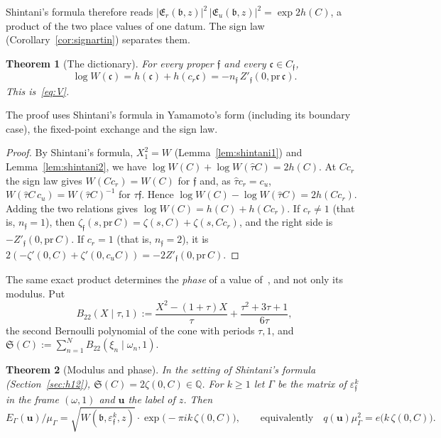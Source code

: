 \documentclass[11pt]{amsart}
\numberwithin{equation}{section}
\theoremstyle{plain}
\newtheorem{theorem}{Theorem}[section]
\theoremstyle{definition}
\theoremstyle{remark}
\begin{document}
Shintani's formula therefore reads \(|\mathfrak E_r(\mathfrak b,z)|^2\,|\mathfrak E_u(\mathfrak b,z)|^2=\exp2h(C)\), a product of the two place values of one datum. The sign law (Corollary~\ref{cor:signartin}) separates them.

\begin{theorem}[The dictionary]\label{thm:dict}
For every proper \(\mathfrak f\) and every \(\mathfrak c\in C_{\mathfrak f}\),
\[\log W(\mathfrak c)=h(\mathfrak c)+h(c_r\mathfrak c)=-n_{\mathfrak f}\,Z'_{\mathfrak f}(0,\mathrm{pr}\,\mathfrak c).\]
This is~\eqref{eq:V}.
\end{theorem}

The proof uses Shintani's formula in Yamamoto's form (including its boundary case), the fixed-point exchange and the sign law.

\begin{proof}
By Shintani's formula, \(X_1^2=W\) (Lemma~\ref{lem:shintani1}) and Lemma~\ref{lem:shintani2}, we have \(\log W(C)+\log W(\hat\tau C)=2h(C)\). At \(Cc_r\) the sign law gives \(W(Cc_r)=W(C)\) for \(\mathfrak f\) and, as \(\hat\tau c_r=c_u\), \(W(\hat\tau C\,c_u)=W(\hat\tau C)^{-1}\) for \(\tau\mathfrak f\). Hence \(\log W(C)-\log W(\hat\tau C)=2h(Cc_r)\). Adding the two relations gives \(\log W(C)=h(C)+h(Cc_r)\). If \(c_r\ne1\) (that is, \(n_{\mathfrak f}=1\)), then \(\zeta_{\mathfrak f}(s,\mathrm{pr}\,C)=\zeta(s,C)+\zeta(s,Cc_r)\), and the right side is \(-Z'_{\mathfrak f}(0,\mathrm{pr}\,C)\). If \(c_r=1\) (that is, \(n_{\mathfrak f}=2\)), it is \(2(-\zeta'(0,C)+\zeta'(0,c_uC))=-2Z'_{\mathfrak f}(0,\mathrm{pr}\,C)\).
\end{proof}

The same exact product determines the \emph{phase} of a value of~\cite{RW}, and not only its modulus. Put
\[B_{22}(X\mid\tau,1):=\frac{X^2-(1+\tau)X}{\tau}+\frac{\tau^2+3\tau+1}{6\tau},\]
the second Bernoulli polynomial of the cone with periods \(\tau,1\), and \(\mathfrak S(C):=\sum_{n=1}^NB_{22}(\xi_n\mid\omega_n,1)\).

\begin{theorem}[Modulus and phase]\label{thm:phase}
In the setting of Shintani's formula (Section~\ref{sec:h12}), \(\mathfrak S(C)=2\zeta(0,C)\in\mathbb Q\). For \(k\ge1\) let \(\Gamma\) be the matrix of \(\varepsilon_{\mathfrak f}^k\) in the frame \((\omega,1)\) and \(\mathbf u\) the label of \(z\). Then
\[E_\Gamma(\mathbf u)/\mu_\Gamma=\sqrt{W(\mathfrak b,\varepsilon_{\mathfrak f}^k,z)}\cdot\exp\bigl(-\pi ik\,\zeta(0,C)\bigr),\qquad\text{equivalently}\quad q(\mathbf u)\mu_\Gamma^2=e\bigl(k\,\zeta(0,C)\bigr).\]
\end{theorem}
\end{document}
